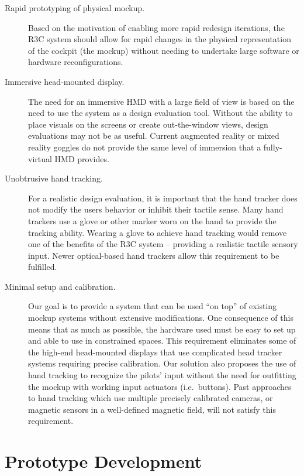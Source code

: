\begin{description}
    \item [Rapid prototyping of physical mockup.]
        Based on the motivation of enabling more rapid redesign iterations, the R3C system should allow for rapid changes in the physical representation of the cockpit (the mockup) without needing to undertake large software or hardware reconfigurations.
    \item [Immersive head-mounted display.]
        The need for an immersive HMD with a large field of view is based on the need to use the system as a design evaluation tool.
        Without the ability to place visuals on the screens or create out-the-window views, design evaluations may not be as useful.
        Current augmented reality or mixed reality goggles do not provide the same level of immersion that a fully-virtual HMD provides.
    \item [Unobtrusive hand tracking.]
        For a realistic design evaluation, it is important that the hand tracker does not modify the users behavior or inhibit their tactile sense.
        Many hand trackers use a glove or other marker worn on the hand to provide the tracking ability.
        Wearing a glove to achieve hand tracking would remove one of the benefits of the R3C system -- providing a realistic tactile sensory input.
        Newer optical-based hand trackers allow this requirement to be fulfilled.
    \item [Minimal setup and calibration.]
        Our goal is to provide a system that can be used ``on top'' of existing mockup systems without extensive modifications.
        One consequence of this means that as much as possible, the hardware used must be easy to set up and able to use in constrained spaces.
        This requirement eliminates some of the high-end head-mounted displays that use complicated head tracker systems requiring precise calibration.
        Our solution also proposes the use of hand tracking to recognize the pilots' input without the need for outfitting the mockup with working input actuators (i.e.\ buttons).
        Past approaches to hand tracking which use multiple precisely calibrated cameras, or magnetic sensors in a well-defined magnetic field, will not satisfy this requirement.
\end{description}

\section{Prototype Development}

